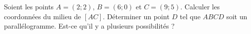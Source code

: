
\begin{exercice}\label{exoSeconde-0011}

    Soient les points \( A=(2;2)\), \( B=(6;0)\) et \( C=(9;5)\). Calculer les coordonnées du milieu de \( [AC]\). Déterminer un point \( D\) tel que \( ABCD\) soit un parallélogramme. Est-ce qu'il y a plusieurs possibilités ?

\end{exercice}
